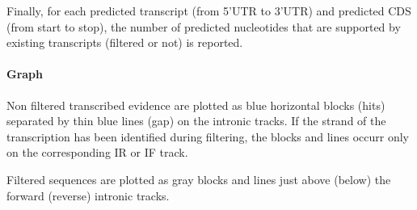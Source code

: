 Finally, for each predicted transcript (from 5'UTR to 3'UTR) and
predicted CDS (from start to stop), the number of predicted
nucleotides that are supported by existing transcripts (filtered or
not) is reported.

\paragraph{Graph}

Non filtered transcribed evidence are plotted as blue horizontal
blocks (hits) separated by thin blue lines (gap) on the intronic
tracks. If the strand of the transcription has been identified during
filtering, the blocks and lines occurr only on the corresponding IR or
IF track.

Filtered sequences are plotted as gray blocks and lines just above
(below) the forward (reverse) intronic tracks.

